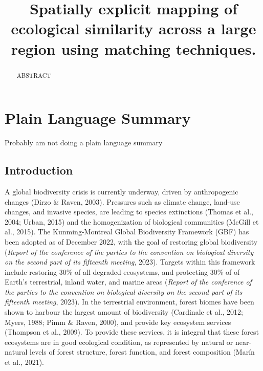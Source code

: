 \documentclass[
]{agujournal2019}
\begin{document}
\title{Spatially explicit mapping of ecological similarity across a
large region using matching techniques.}



\begin{abstract}
ABSTRACT
\end{abstract}

\section*{Plain Language Summary}
Probably am not doing a plain language summary



\subsection{Introduction}\label{introduction}

A global biodiversity crisis is currently underway, driven by
anthropogenic changes (Dirzo \& Raven, 2003). Pressures such as climate
change, land-use changes, and invasive species, are leading to species
extinctions (Thomas et al., 2004; Urban, 2015) and the homogenization of
biological communities (McGill et al., 2015). The Kunming-Montreal
Global Biodiversity Framework (GBF) has been adopted as of December
2022, with the goal of restoring global biodiversity (\emph{Report of
the conference of the parties to the convention on biological diversity
on the second part of its fifteenth meeting}, 2023). Targets within this
framework include restoring 30\% of all degraded ecosystems, and
protecting 30\% of of Earth's terrestrial, inland water, and marine
areas (\emph{Report of the conference of the parties to the convention
on biological diversity on the second part of its fifteenth meeting},
2023). In the terrestrial environment, forest biomes have been shown to
harbour the largest amount of biodiversity (Cardinale et al., 2012;
Myers, 1988; Pimm \& Raven, 2000), and provide key ecosystem services
(Thompson et al., 2009). To provide these services, it is integral that
these forest ecosystems are in good ecological condition, as represented
by natural or near-natural levels of forest structure, forest function,
and forest composition (Marín et al., 2021).
\end{document}
